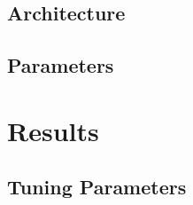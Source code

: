 \documentclass[final,3p]{CSP}
\begin{document}
		\subsection{Architecture}
		
		\subsection{Parameters}
		
	\newpage
	\section{Results}
		
		\subsection{Tuning Parameters}
		
		
		
	
	
	\newpage
	\it
	
	
	
\end{document}
